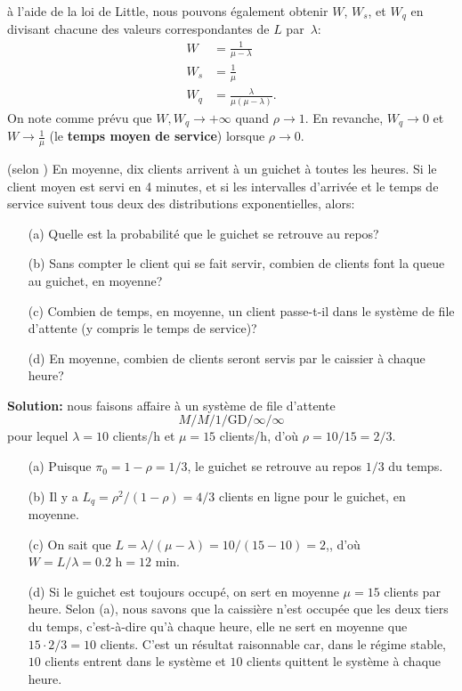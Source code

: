 à l'aide de la loi de Little, nous pouvons également obtenir $W$, $W_{s}$, et $W_{q}$ en divisant chacune des valeurs correspondantes de $L$ par~$\lambda$:
\begin{align*}
W &= \frac{1}{\mu - \lambda}\\
W_{s} &= \frac{1}{\mu}\\
W_{q} &= \frac{\lambda}{\mu(\mu-\lambda)}.
 \end{align*}
On note comme prévu que $W,W_q\to +\infty$ quand $\rho\to 1$. En revanche, $W_{q}\to 0$ et $W\to \frac{1}{\mu}$ (le \textbf{temps moyen de service}) lorsque $\rho\to 0$.
\begin{Exemple} (selon \cite{QS_W}) En moyenne, dix clients arrivent à un guichet à toutes les heures. Si le client moyen est servi en 4 minutes, et si les intervalles d'arrivée et le temps de service suivent tous deux des distributions exponentielles, alors: \begin{itemize}[noitemsep]
	\item[(a)] Quelle est la probabilité que le guichet se retrouve au repos? 
	\item[(b)] Sans compter le client qui se fait servir, combien de clients font la queue au guichet, en moyenne? \item[(c)] Combien de temps, en moyenne, un client passe-t-il dans le système de file d'attente (y compris le temps de service)?
	\item[(d)] En moyenne, combien de clients seront servis par le caissier à chaque heure?
\end{itemize}
\textbf{Solution:} nous faisons affaire à un système de file d'attente $$M/M/1/\textrm{GD}/\infty/\infty$$ pour lequel $\lambda = 10$ clients/h et $\mu = 15$ clients/h, d'où   $\rho = 10/15 = 2/3$.
\begin{itemize}[noitemsep]
	\item[(a)] Puisque  $\pi_{0} = 1 - \rho = 1/3$, le guichet se retrouve au repos $1/3$ du temps.  
	\item[(b)] Il y a $L_{q} = \rho^{2}/(1-\rho) = 4/3$ clients en ligne pour le guichet, en moyenne. 
	\item[(c)] On sait que $L = \lambda/(\mu - \lambda) = 10/(15-10) = 2$,, d'où  $W = L/\lambda = 0.2 \textrm{ h} = 12 \textrm{ min}$.
	\item[(d)] Si le guichet est toujours occupé, on sert en moyenne $\mu=15$ clients par heure. Selon (a), nous savons que la caissière n'est occupée que les deux tiers du temps, c'est-à-dire qu'à chaque heure, elle ne sert en moyenne que $15  \cdot 2/3 = 10 $ clients. C'est un résultat raisonnable car, dans le régime stable, $10$ clients entrent dans le système  et $10$ clients quittent le système à chaque heure.
\end{itemize}
\end{Exemple}
